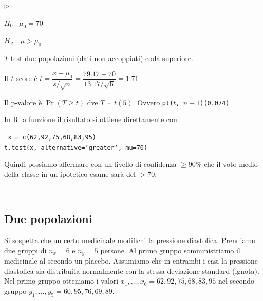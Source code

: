 \documentclass[12pt,openany]{book}
\newcommand{\mylabel}[1]{{\footnotesize\textsf{#1}}\hfill}
\renewenvironment{itemize}
  {\begin{list}{$\triangleright$}{%
   \setlength{\parskip}{0mm}
   \setlength{\topsep}{.2\baselineskip}
   \setlength{\rightmargin}{0mm}
   \setlength{\listparindent}{0mm}
   \setlength{\itemindent}{0mm}
   \setlength{\labelwidth}{3ex}
   \setlength{\itemsep}{.4\baselineskip}
   \setlength{\parsep}{0mm}
   \setlength{\partopsep}{0mm}
   \setlength{\labelsep}{1ex}
   \setlength{\leftmargin}{\labelwidth+\labelsep}
   \let\makelabel\mylabel}}{%
   \end{list}\vspace*{-1.3mm}}
\theoremstyle{mio}
\theoremstyle{liscio}
\begin{document}
\begin{itemize}
\item[1.] $H_0$ \ $\mu_0 = 70$

\item[2.] $H_A$ \ $\mu>\mu_0$

\item[3.] $T$-test due popolazioni (dati non accoppiati) coda superiore. 

\item[4.] Il $t$-score è 
$t = \dfrac{\bar x - \mu_0}{s/\sqrt{n}}=\dfrac{79.17-70}{13.17/\sqrt{6}} = 1.71$

\item[5.] Il p-valore è $\Pr(T\ge t)$ dve $T\sim t(5)$. Ovvero {\tt pt($t$, $n-1$)}\hfill{\tt (0.074)}


\hrulefill\hfill\hfill

In R la funzione il risultato si ottiene direttamente con

{\tt 
x = c(62,92,75,68,83,95)\\
t.test(x, alternative='greater', mu=70)}

Quindi possiamo affermare con un livello di confidenza $\ge 90\%$ che il voto medio della classe in un ipotetico esame sarà del $>70$.  
\end{itemize}


\hfill{}\clearpage\
\subsection{Due popolazioni}
Si sospetta che un certo medicinale modifichi la pressione diastolica.  Prendiamo due gruppi di $n_x=6$ e $n_y=5$ persone. Al primo gruppo somministriamo il medicinale al secondo un placebo. Assumiamo che in entrambi i casi la pressione diastolica sia distribuita normalmente con la stessa deviazione standard (ignota). Nel primo gruppo otteniamo i valori $x_1,\dots,x_6=62,92,75,68,83,95$ nel secondo gruppo $y_1,\dots,y_5=60,95,76,69,89$.
\end{document}
